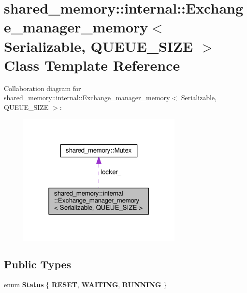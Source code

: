 \hypertarget{classshared__memory_1_1internal_1_1Exchange__manager__memory}{}\section{shared\+\_\+memory\+:\+:internal\+:\+:Exchange\+\_\+manager\+\_\+memory$<$ Serializable, Q\+U\+E\+U\+E\+\_\+\+S\+I\+ZE $>$ Class Template Reference}
\label{classshared__memory_1_1internal_1_1Exchange__manager__memory}


Collaboration diagram for shared\+\_\+memory\+:\+:internal\+:\+:Exchange\+\_\+manager\+\_\+memory$<$ Serializable, Q\+U\+E\+U\+E\+\_\+\+S\+I\+ZE $>$\+:
\nopagebreak
\begin{figure}[H]
\begin{center}
\leavevmode
\includegraphics[width=235pt]{classshared__memory_1_1internal_1_1Exchange__manager__memory__coll__graph}
\end{center}
\end{figure}
\subsection*{Public Types}
\begin{DoxyCompactItemize}
\item 
enum {\bfseries Status} \{ {\bfseries R\+E\+S\+ET}, 
{\bfseries W\+A\+I\+T\+I\+NG}, 
{\bfseries R\+U\+N\+N\+I\+NG}
 \}\hypertarget{classshared__memory_1_1internal_1_1Exchange__manager__memory_a111ddeef03bfb038bcbc170c28878c08}{}\label{classshared__memory_1_1internal_1_1Exchange__manager__memory_a111ddeef03bfb038bcbc170c28878c08}

\end{DoxyCompactItemize}
